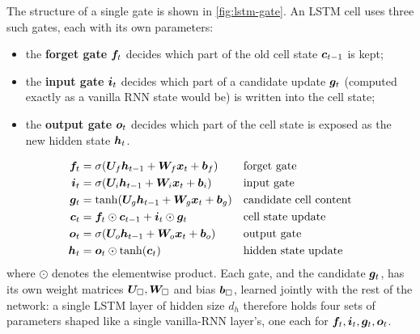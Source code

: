 The structure of a single gate is shown in \autoref{fig:lstm-gate}. An LSTM cell uses three such gates, each with its own parameters:
\begin{itemize}
    \item the \textbf{forget gate} $\bm{f}_t$ decides which part of the old cell state $\bm{c}_{t-1}$ is kept;
    \item the \textbf{input gate} $\bm{i}_t$ decides which part of a candidate update $\bm{g}_t$ (computed exactly as a vanilla RNN state would be) is written into the cell state;
    \item the \textbf{output gate} $\bm{o}_t$ decides which part of the cell state is exposed as the new hidden state $\bm{h}_t$.
\end{itemize}
\begin{align}
\bm{f}_t &= \sigma(\bm{U}_f \bm{h}_{t-1} + \bm{W}_f \bm{x}_t + \bm{b}_f) &&\text{forget gate} \\
\bm{i}_t &= \sigma(\bm{U}_i \bm{h}_{t-1} + \bm{W}_i \bm{x}_t + \bm{b}_i) &&\text{input gate} \\
\bm{g}_t &= \tanh(\bm{U}_g \bm{h}_{t-1} + \bm{W}_g \bm{x}_t + \bm{b}_g) &&\text{candidate cell content} \\
\bm{c}_t &= \bm{f}_t \odot \bm{c}_{t-1} + \bm{i}_t \odot \bm{g}_t &&\text{cell state update} \\
\bm{o}_t &= \sigma(\bm{U}_o \bm{h}_{t-1} + \bm{W}_o \bm{x}_t + \bm{b}_o) &&\text{output gate} \\
\bm{h}_t &= \bm{o}_t \odot \tanh(\bm{c}_t) &&\text{hidden state update}
\end{align}
where $\odot$ denotes the elementwise product. Each gate, and the candidate $\bm{g}_t$, has its own weight matrices $\bm{U}_\square, \bm{W}_\square$ and bias $\bm{b}_\square$, learned jointly with the rest of the network: a single LSTM layer of hidden size $d_h$ therefore holds four sets of parameters shaped like a single vanilla-RNN layer's, one each for $\bm{f}_t, \bm{i}_t, \bm{g}_t, \bm{o}_t$.

